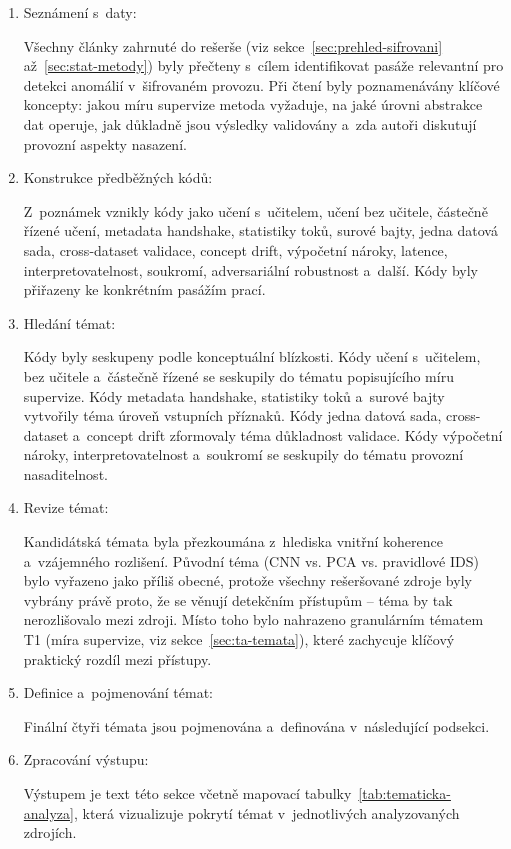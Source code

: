 \begin{enumerate}
\item Seznámení s~daty:

Všechny články zahrnuté do rešerše (viz sekce~\ref{sec:prehled-sifrovani} až~\ref{sec:stat-metody}) byly přečteny s~cílem identifikovat pasáže relevantní pro detekci anomálií v~šifrovaném provozu. Při čtení byly poznamenávány klíčové koncepty: jakou míru supervize metoda vyžaduje, na jaké úrovni abstrakce dat operuje, jak důkladně jsou výsledky validovány a~zda autoři diskutují provozní aspekty nasazení.

\item Konstrukce předběžných kódů:

Z~poznámek vznikly kódy jako učení s~učitelem, učení bez učitele, částečně řízené učení, metadata handshake, statistiky toků, surové bajty, jedna datová sada, cross-dataset validace, concept drift, výpočetní nároky, latence, interpretovatelnost, soukromí, adversariální robustnost a~další. Kódy byly přiřazeny ke konkrétním pasážím prací.

\item Hledání témat:

Kódy byly seskupeny podle konceptuální blízkosti. Kódy učení s~učitelem, bez učitele a~částečně řízené se seskupily do tématu popisujícího míru supervize. Kódy metadata handshake, statistiky toků a~surové bajty vytvořily téma úroveň vstupních příznaků. Kódy jedna datová sada, cross-dataset a~concept drift zformovaly téma důkladnost validace. Kódy výpočetní nároky, interpretovatelnost a~soukromí se seskupily do tématu provozní nasaditelnost.

\item Revize témat:

Kandidátská témata byla přezkoumána z~hlediska vnitřní koherence a~vzájemného rozlišení. Původní téma  (CNN vs. PCA vs. pravidlové IDS) bylo vyřazeno jako příliš obecné, protože všechny rešeršované zdroje byly vybrány právě proto, že se věnují detekčním přístupům -- téma by tak nerozlišovalo mezi zdroji. Místo toho bylo nahrazeno granulárním tématem T1 (míra supervize, viz sekce~\ref{sec:ta-temata}), které zachycuje klíčový praktický rozdíl mezi přístupy.

\item Definice a~pojmenování témat:

Finální čtyři témata jsou pojmenována a~definována v~následující podsekci.

\item Zpracování výstupu:

Výstupem je text této sekce včetně mapovací tabulky~\ref{tab:tematicka-analyza}, která vizualizuje pokrytí témat v~jednotlivých analyzovaných zdrojích.
\end{enumerate}

